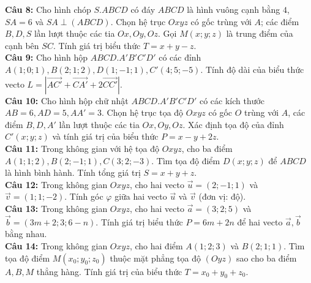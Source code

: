 \documentclass[12pt]{article}
\begin{document}
	
	\vspace{3mm}
	\noindent \textbf{Câu 8:} Cho hình chóp $S.ABCD$ có đáy $ABCD$ là hình vuông cạnh bằng $4$, $SA = 6$ và $SA \perp (ABCD)$. Chọn hệ trục $Oxyz$ có gốc trùng với $A$; các điểm $B, D, S$ lần lượt thuộc các tia $Ox, Oy, Oz$. Gọi $M(x; y; z)$ là trung điểm của cạnh bên $SC$. Tính giá trị biểu thức $T = x + y - z$. \\
	
	
	\vspace{3mm}
	\noindent \textbf{Câu 9:} Cho hình hộp $ABCD.A'B'C'D'$ có các đỉnh $A(1;0;1), B(2;1;2), D(1;-1;1), C'(4;5;-5)$. Tính độ dài của biểu thức vecto $L = \left| \vec{AC'} + \vec{CA'} + 2\vec{CC'} \right|$. \\
	
	
	\vspace{3mm}
	\noindent \textbf{Câu 10:} Cho hình hộp chữ nhật $ABCD.A'B'C'D'$ có các kích thước $AB = 6, AD = 5, AA' = 3$. Chọn hệ trục tọa độ $Oxyz$ có gốc $O$ trùng với $A$, các điểm $B, D, A'$ lần lượt thuộc các tia $Ox, Oy, Oz$. Xác định tọa độ của đỉnh $C'(x; y; z)$ và tính giá trị của biểu thức $P = x - y + 2z$. \\
	
	
	\vspace{3mm}
	\noindent \textbf{Câu 11:} Trong không gian với hệ tọa độ $Oxyz$, cho ba điểm $A(1; 1; 2), B(2; -1; 1), C(3; 2; -3)$. Tìm tọa độ điểm $D(x; y; z)$ để $ABCD$ là hình bình hành. Tính tổng giá trị $S = x + y + z$. \\
	
	
	\vspace{3mm}
	\noindent \textbf{Câu 12:} Trong không gian $Oxyz$, cho hai vecto $\vec{u} = (2; -1; 1)$ và $\vec{v} = (1; 1; -2)$. Tính góc $\varphi$ giữa hai vecto $\vec{u}$ và $\vec{v}$ (đơn vị: độ). \\
	
	\noindent \textbf{Câu 13:} Trong không gian $Oxyz$, cho hai vecto $\vec{a} = (3; 2; 5)$ và $\vec{b} = (3m + 2; 3; 6 - n)$. Tính giá trị biểu thức $P = 6m + 2n$ để hai vecto $\vec{a}, \vec{b}$ bằng nhau. \\
	
	
	\vspace{3mm}
	\noindent \textbf{Câu 14:} Trong không gian $Oxyz$, cho hai điểm $A(1; 2; 3)$ và $B(2; 1; 1)$. Tìm tọa độ điểm $M(x_0; y_0; z_0)$ thuộc mặt phẳng tọa độ $(Oyz)$ sao cho ba điểm $A, B, M$ thẳng hàng. Tính giá trị của biểu thức $T = x_0 + y_0 + z_0$. \\
	
\end{document}
